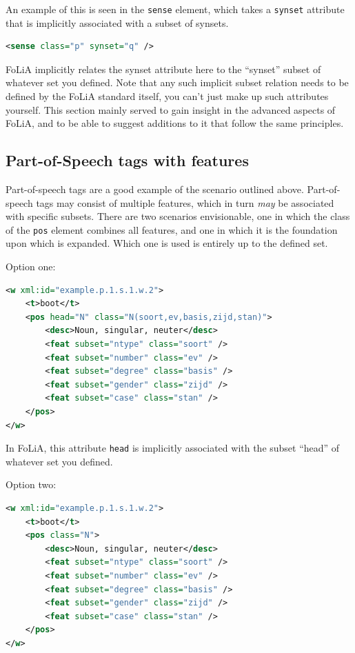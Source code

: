 \documentclass[a4paper,12pt]{report}
\begin{document}
An example of this is seen in the \texttt{sense} element, which takes a \texttt{synset} attribute that is implicitly associated with a subset of synsets.

\begin{lstlisting}[language=xml]
<sense class="p" synset="q" />
\end{lstlisting}

FoLiA implicitly relates the synset attribute here to the ``synset'' subset of whatever set you defined. Note that any such implicit subset relation needs to be defined by the FoLiA standard itself, you can't just make up such attributes yourself. This section mainly served to gain insight in the advanced aspects of FoLiA, and to be able to suggest additions to it that follow the same principles.

\subsection{Part-of-Speech tags with features}
\label{sec:posfeat}

Part-of-speech tags are a good example of the scenario outlined above. Part-of-speech tags may consist of multiple features, which in turn \emph{may} be associated with specific subsets. There are two scenarios envisionable, one in which the class of the \texttt{pos} element combines all features, and one in which it is the foundation upon which is expanded. Which one is used is entirely up to the defined set.

Option one:

\begin{lstlisting}[language=xml]
<w xml:id="example.p.1.s.1.w.2">
    <t>boot</t>
    <pos head="N" class="N(soort,ev,basis,zijd,stan)">
        <desc>Noun, singular, neuter</desc>
        <feat subset="ntype" class="soort" />
        <feat subset="number" class="ev" />
        <feat subset="degree" class="basis" />
        <feat subset="gender" class="zijd" />
        <feat subset="case" class="stan" />
    </pos>
</w>
\end{lstlisting}

In FoLiA, this attribute \texttt{head} is implicitly associated with the subset ``head'' of whatever set you defined.

Option two:

\begin{lstlisting}[language=xml]
<w xml:id="example.p.1.s.1.w.2">
    <t>boot</t>
    <pos class="N">
        <desc>Noun, singular, neuter</desc>
        <feat subset="ntype" class="soort" />
        <feat subset="number" class="ev" />
        <feat subset="degree" class="basis" />
        <feat subset="gender" class="zijd" />
        <feat subset="case" class="stan" />
    </pos>
</w>
\end{lstlisting}
\end{document}
